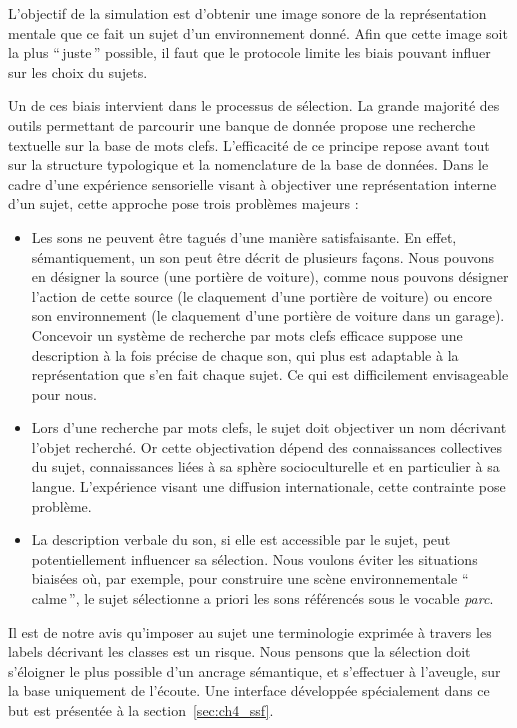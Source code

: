 L'objectif de la simulation est d'obtenir une image sonore de la représentation mentale que ce fait un sujet d'un environnement donné. Afin que cette image soit la plus ``\,juste\,'' possible, il faut que le protocole limite les biais pouvant influer sur les choix du sujets.

Un de ces biais intervient dans le processus de sélection. La grande majorité des outils permettant de parcourir une banque de donnée propose une recherche textuelle sur la base de mots clefs. L’efficacité de ce principe repose avant tout sur la structure typologique et la nomenclature de la base de données. Dans le cadre d'une expérience sensorielle visant à objectiver une représentation interne d'un sujet, cette approche pose trois problèmes majeurs :

\begin{itemize}
\item Les sons ne peuvent être tagués d'une manière satisfaisante. En effet, sémantiquement, un son peut être décrit de plusieurs façons. Nous pouvons en désigner la source (une portière de voiture), comme nous pouvons désigner l'action de cette source (le claquement d’une portière de voiture) ou encore son environnement (le claquement d’une portière de voiture dans un garage). Concevoir un système de recherche par mots clefs efficace suppose une description à la fois précise de chaque son, qui plus est adaptable à la représentation que s’en fait chaque sujet. Ce qui est difficilement envisageable pour nous.

\item Lors d'une recherche par mots clefs, le sujet doit objectiver un nom décrivant l'objet recherché. Or cette objectivation dépend des connaissances collectives du sujet, connaissances liées à sa sphère socioculturelle et en particulier à sa langue. L'expérience visant une diffusion internationale, cette contrainte pose problème.

\item La description verbale du son, si elle est accessible par le sujet, peut potentiellement influencer sa sélection. Nous voulons éviter les situations biaisées où, par exemple, pour construire une scène environnementale ``\,calme\,'', le sujet sélectionne a priori les sons référencés sous le vocable \emph{parc}.
\end{itemize}

Il est de notre avis qu'imposer au sujet une terminologie exprimée à travers les labels décrivant les classes est un risque. Nous pensons que la sélection doit s'éloigner le plus possible d'un ancrage sémantique, et s'effectuer à l'aveugle, \ie sur la base uniquement de l'écoute. Une interface développée spécialement dans ce but est présentée à la section~\ref{sec:ch4_ssf}.

